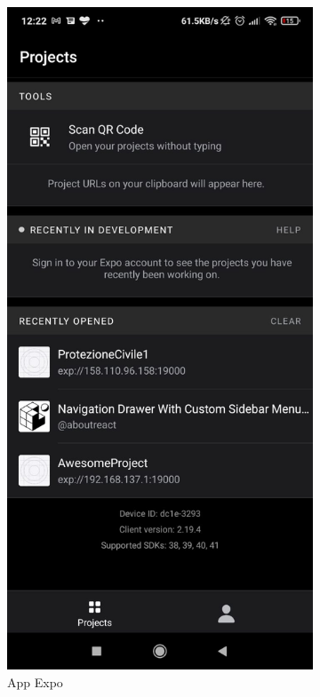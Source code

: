 \documentclass[11pt,a4paper,english]{article}
\begin{document}
\begin{figure}[H]
    \centering
    \begin{subfigure}{.4\textwidth}
      \centering
      \includegraphics[width=0.8\linewidth]{img/debug_app_1.jpeg}
      \caption{App Expo}
    \end{subfigure}%
    \begin{subfigure}{.4\textwidth}
      \centering

\end{subfigure}
\end{figure}
\end{document}
